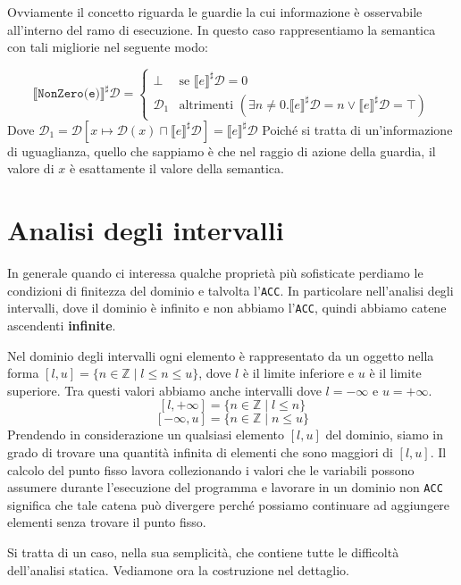 Ovviamente il concetto riguarda le guardie la cui informazione è osservabile 
all'interno del ramo di esecuzione.
In questo caso rappresentiamo la semantica con tali migliorie nel seguente modo:

 \[
        \llbracket \texttt{NonZero(e)} \rrbracket^\sharp \mathcal{D} = 
        \begin{cases}
            \bot & \text{se } \llbracket e \rrbracket^\sharp \mathcal{D} = 0 \\
            \mathcal{D}_1 & \text{altrimenti } (\exists n \not = 0 . 
            \llbracket e \rrbracket^\sharp \mathcal{D} = n \lor
            \llbracket e \rrbracket^\sharp \mathcal{D} = \top)
        \end{cases}  
\]
Dove $\mathcal{D}_1 = \mathcal{D}[x \mapsto \mathcal{D}(x)
\sqcap \llbracket e \rrbracket^\sharp \mathcal{D}] = \llbracket e \rrbracket^\sharp \mathcal{D}$
Poiché si tratta di un'informazione di uguaglianza, quello che sappiamo è che nel raggio di 
azione della guardia, il valore di $x$ è esattamente il valore della semantica.
\section{Analisi degli intervalli}
In generale quando ci interessa qualche proprietà più sofisticate perdiamo 
le condizioni di finitezza del dominio e talvolta l'\texttt{ACC}. In particolare 
nell'analisi degli intervalli, dove il dominio è 
infinito e non abbiamo l'\texttt{ACC}, quindi abbiamo 
catene ascendenti \textbf{infinite}.

Nel dominio degli intervalli ogni elemento è rappresentato da un oggetto nella 
forma $[l, u] = \{n \in \mathbb{Z} \mid l \leq n \leq u\}$, dove $l$ è il 
limite inferiore e $u$ è il limite superiore.
Tra questi valori abbiamo anche intervalli dove $l = -\infty$ e $u = +\infty$.
\[
  [l, +\infty] = \{n \in \mathbb{Z} \mid l \leq n\}  
\]
\[
  [-\infty, u] = \{n \in \mathbb{Z} \mid n \leq u\}
\]
Prendendo in considerazione un qualsiasi elemento $[l, u]$ del dominio,
siamo in grado di trovare una quantità infinita di elementi che sono maggiori
di $[l, u]$. Il calcolo del punto fisso lavora collezionando 
i valori che le variabili possono assumere durante l'esecuzione del programma e 
lavorare in un dominio non \texttt{ACC} significa che tale catena può divergere 
perché possiamo continuare ad aggiungere elementi senza trovare il punto fisso.

Si tratta di un caso, nella sua semplicità, che contiene tutte le difficoltà 
dell'analisi statica. Vediamone ora la costruzione nel dettaglio.

